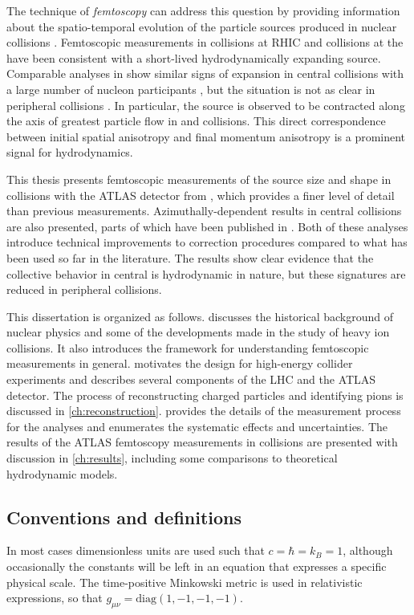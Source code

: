 The technique of \emph{femtoscopy} can address this question by providing information about the spatio-temporal evolution of the particle sources produced in nuclear collisions \cite{Lisa:2005dd}.
Femtoscopic measurements in \AuAu collisions at \ac{RHIC} and \PbPb collisions at the \lhc have been consistent with a short-lived hydrodynamically expanding source.
Comparable analyses in \pPb show similar signs of expansion in central collisions with a large number of nucleon participants \Npart, but the situation is not as clear in peripheral collisions \cite{Abelev:2014pja,Adam:2015pya}.
In particular, the source is observed to be contracted along the axis of greatest particle flow in \AuAu \cite{Adams:2003ra,Adare:2014vax,Adamczyk:2014mxp} and \PbPb \cite{Adamova:2017opl} collisions.
This direct correspondence between initial spatial anisotropy and final momentum anisotropy is a prominent signal for hydrodynamics.

This thesis presents femtoscopic measurements of the source size and shape in \pPb collisions with the ATLAS detector from , which provides a finer level of detail than previous measurements.
Azimuthally-dependent results in central \pPb collisions are also presented, parts of which have been published in .
Both of these analyses introduce technical improvements to correction procedures compared to what has been used so far in the literature.
The results show clear evidence that the collective behavior in central \pPb is hydrodynamic in nature, but these signatures are reduced in peripheral collisions.

This dissertation is organized as follows.
 discusses the historical background of nuclear physics and some of the developments made in the study of heavy ion collisions.
It also introduces the framework for understanding femtoscopic measurements in general.
 motivates the design for high-energy collider experiments and describes several components of the \ac{LHC} and the ATLAS detector.
The process of reconstructing charged particles and identifying pions is discussed in \cref{ch:reconstruction}.
 provides the details of the measurement process for the analyses and enumerates the systematic effects and uncertainties.
The results of the ATLAS femtoscopy measurements in \pPb collisions are presented with discussion in \cref{ch:results}, including some comparisons to theoretical hydrodynamic models.

\subsection*{Conventions and definitions}
In most cases dimensionless units are used such that $c = \hbar = k_B = 1$, although occasionally the constants will be left in an equation that expresses a specific physical scale. The time-positive Minkowski metric is used in relativistic expressions, so that $g_{\mu\nu} = \mathrm{diag}\left( 1, -1, -1, -1\right)$.

